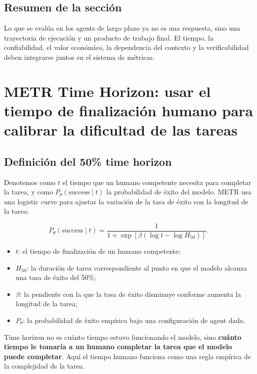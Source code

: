 \documentclass[a4paper]{article}
\begin{document}
\subsection{Resumen de la sección}

Lo que se evalúa en los agents de largo plazo ya no es una respuesta, sino una trayectoria de ejecución y un producto de trabajo final. El tiempo, la confiabilidad, el valor económico, la dependencia del contexto y la verificabilidad deben integrarse juntos en el sistema de métricas.

\section{METR Time Horizon: usar el tiempo de finalización humano para calibrar la dificultad de las tareas}

\subsection{Definición del 50\% time horizon}


Denotemos como $t$ el tiempo que un humano competente necesita para completar la tarea, y como $P_\theta(\text{success}\mid t)$ la probabilidad de éxito del modelo. METR usa una logistic curve para ajustar la variación de la tasa de éxito con la longitud de la tarea:

$$
P_\theta(\text{success}\mid t)=
\frac{1}{1+\exp\left[\beta\left(\log t-\log H_{50}\right)\right]}.
$$

\begin{itemize}
    \item $t$: el tiempo de finalización de un humano competente;
    \item $H_{50}$: la duración de tarea correspondiente al punto en que el modelo alcanza una tasa de éxito del 50\%;
    \item $\beta$: la pendiente con la que la tasa de éxito disminuye conforme aumenta la longitud de la tarea;
    \item $P_\theta$: la probabilidad de éxito empírica bajo una configuración de agent dada.
\end{itemize}

Time horizon no es cuánto tiempo estuvo funcionando el modelo, sino \textbf{cuánto tiempo le tomaría a un humano completar la tarea que el modelo puede completar}. Aquí el tiempo humano funciona como una regla empírica de la complejidad de la tarea.
\end{document}
